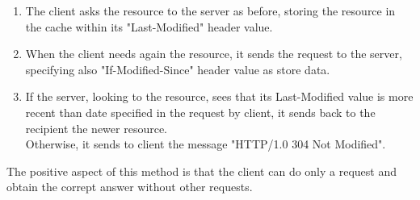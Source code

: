 \begin{itemize}
{\begin{enumerate}
\item{The client asks the resource to the server as before, storing the resource in the cache within its "Last-Modified" header value.}
\item{When the client needs again the resource, it sends the request to the server, specifying also "If-Modified-Since" header value as store data.
}
\item{If the server, looking to the resource, sees that its Last-Modified value is more recent than date specified in the request by client, it sends back to the recipient the newer resource.\\
Otherwise, it sends to client the message "HTTP/1.0 304 Not Modified".}
\end{enumerate}
The positive aspect of this method is that the client can do only a request and obtain the corrept answer without other requests.
\begin{figure}[h]
\centering

\end{figure}}
\end{itemize}
